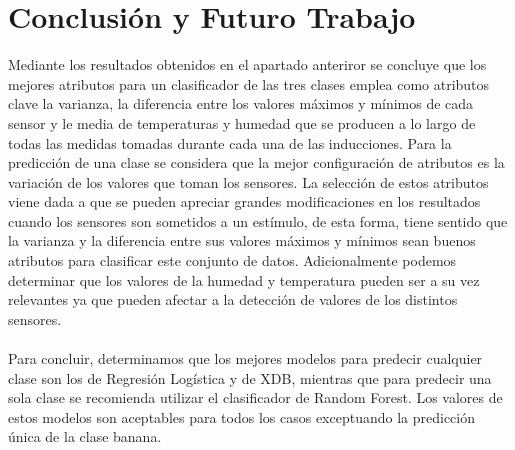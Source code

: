 \documentclass{esannV2}
\begin{document}
\section{Conclusión y Futuro Trabajo}
Mediante los resultados obtenidos en el apartado anteriror se concluye que los mejores atributos para un clasificador de las tres clases emplea como atributos clave la varianza, la diferencia entre los valores máximos y mínimos de cada sensor y le media de temperaturas y humedad que se producen a lo largo de todas las medidas tomadas durante cada una de las inducciones.  Para la predicción de una clase se considera que la mejor configuración de atributos es la variación de los valores que toman los sensores. La selección de estos atributos viene dada a que se pueden apreciar grandes modificaciones en los resultados cuando los sensores son sometidos a un estímulo, de esta forma, tiene sentido que la varianza y la diferencia entre sus valores máximos y mínimos sean buenos atributos para clasificar este conjunto de datos. Adicionalmente podemos determinar que los valores de la humedad y temperatura pueden ser a su vez relevantes ya que pueden afectar a la detección de valores de los distintos sensores. \\ \\
Para concluir, determinamos que los mejores modelos para predecir cualquier clase son los de Regresión  Logística y de XDB, mientras que para predecir una sola clase se recomienda utilizar el clasificador de Random Forest. Los valores de estos modelos son aceptables para todos los casos exceptuando la predicción única de la clase banana.\\ \\

\end{document}
